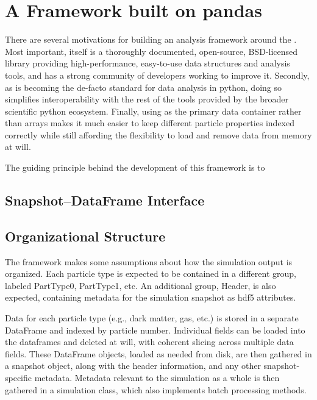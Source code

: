 \section{A Framework built on pandas}
\label{framework}

There are several motivations for building an analysis framework around the . 
Most important,  itself is a thoroughly documented, open-source, BSD-licensed library providing high-performance, easy-to-use data structures and analysis tools, and has a strong community of developers working to improve it.  
Secondly, as  is becoming the de-facto standard for data analysis in python, doing so simplifies interoperability with the rest of the tools provided by the broader scientific python ecosystem.
Finally, using  as the primary data container rather than  arrays makes it much easier to keep different particle properties indexed correctly while still affording the flexibility to load and remove data from memory at will.

The guiding principle behind the development of this framework is to 

\subsection{Snapshot--DataFrame Interface}

\subsection{Organizational Structure}
\label{hierarchy}
The framework makes some assumptions about how the simulation output is organized.  Each particle type is expected to be contained in a different group, labeled PartType0, PartType1, etc. An additional group, Header, is also expected, containing metadata for the simulation snapshot as hdf5 attributes.  

Data for each particle type (e.g., dark matter, gas, etc.) is stored in a separate DataFrame and indexed by particle number.  Individual fields can be loaded into the dataframes and deleted at will, with coherent slicing across multiple data fields.   These DataFrame objects, loaded as needed from disk, are then gathered in a snapshot object, along with the header information, and any other snapshot-specific metadata.  Metadata relevant to the simulation as a whole is then gathered in a simulation class, which also implements batch processing methods.

